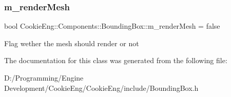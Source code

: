 \subsubsection{\texorpdfstring{m\+\_\+render\+Mesh}{m\_renderMesh}}
{\footnotesize\ttfamily bool Cookie\+Eng\+::\+Components\+::\+Bounding\+Box\+::m\+\_\+render\+Mesh = false\hspace{0.3cm}{\ttfamily [protected]}}

Flag wether the mesh should render or not 

The documentation for this class was generated from the following file\+:\begin{DoxyCompactItemize}
\item 
D\+:/\+Programming/\+Engine Development/\+Cookie\+Eng/\+Cookie\+Eng/include/Bounding\+Box.\+h\end{DoxyCompactItemize}
